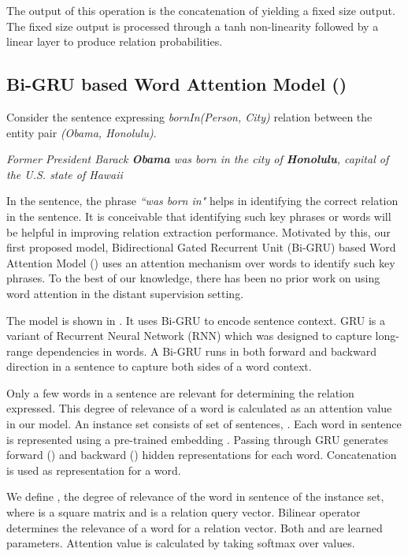 \documentclass{article}
\begin{document}
The output of this operation is the concatenation of  yielding a fixed size output. The fixed size output is processed through a tanh non-linearity followed by a linear layer to produce relation probabilities.

\subsection{Bi-GRU based Word Attention Model (\systemwa{})}
\label{sec:wordatt}

Consider the sentence expressing \textit{bornIn(Person, City)} relation between the entity pair \textit{(Obama, Honolulu)}.

\begin{center}
\textit{Former President Barack \textbf{Obama} was born in the city of \textbf{Honolulu}, capital of the U.S. state of Hawaii}
\end{center}

 In the sentence, the phrase \textit{``was born in"} helps in identifying the correct relation in the sentence. It is conceivable that identifying such key phrases or words will be helpful in improving relation extraction performance. Motivated by this, our first proposed model, Bidirectional Gated Recurrent Unit (Bi-GRU) based Word Attention Model (\systemwa{}) uses an attention mechanism over words to identify such key phrases. To the best of our knowledge, there has been no prior work on using word attention in the distant supervision setting.

The \systemwa{} model is shown in . It uses Bi-GRU to encode sentence context. GRU \cite{cho2014properties} is a variant of Recurrent Neural Network (RNN) which was designed to capture long-range dependencies in words. A Bi-GRU runs in both forward and backward direction in a sentence to capture both sides of a word context. 

Only a few words in a sentence are relevant for determining the relation expressed. This degree of relevance of a word is calculated as an attention value in our model. An instance set  consists of set of sentences, . Each word in sentence  is represented using a pre-trained embedding . Passing  through GRU generates forward () and backward () hidden representations for each word. Concatenation  is used as representation for a word.


We define , the degree of relevance of the  word in  sentence of the instance set, \noindent where  is a square matrix and  is a relation query vector. Bilinear operator  determines the relevance of a word for a relation vector. Both  and  are learned parameters. Attention value  is calculated by taking softmax over  values. 
    
\end{document}
